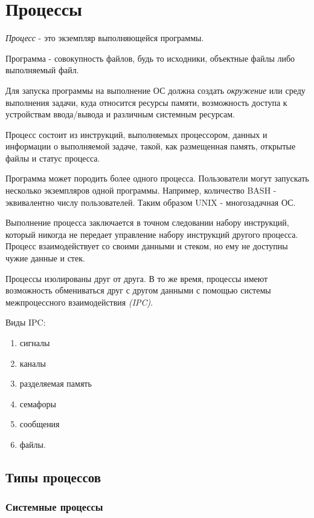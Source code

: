 \chapter{Процессы}

\emph{Процесс} - это экземпляр выполняющейся программы.

Программа - совокупность файлов, будь то исходники, объектные файлы либо выполняемый файл.

Для запуска программы  на выполнение ОС  должна создать \emph{окружение} или среду выполнения задачи, куда относится ресурсы памяти, возможность доступа к устройствам ввода/вывода и различным системным ресурсам.

Процесс состоит из инструкций, выполняемых процессором, данных и информации о выполняемой задаче, такой, как размещенная память, открытые файлы и статус процесса.

Программа может породить более одного процесса. Пользователи могут запускать несколько экземпляров одной программы. Например, количество BASH - эквивалентно числу пользователей. Таким образом UNIX - многозадачная ОС.

Выполнение процесса заключается в точном следовании набору инструкций, который никогда не передает управление набору инструкций другого процесса. Процесс взаимодействует со своими данными и стеком, но ему не доступны чужие данные и стек. 

Процессы изолированы друг от друга. В то же время, процессы имеют возможность обмениваться друг с другом данными с помощью системы межпроцессного взаимодействия \emph{(IPC)}.

Виды IPC:
\begin{enumerate}
\item сигналы
\item каналы
\item разделяемая память
\item семафоры
\item сообщения
\item файлы.
\end{enumerate}

\section{Типы процессов}

\subsection{Системные процессы}

